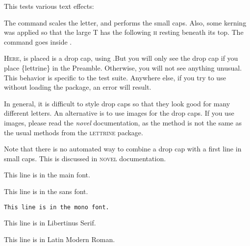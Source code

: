 \documentclass[test]{novel} %
\begin{document}
\clearpage



This tests various text effects:

\null


The \string\charscale\space command scales the letter, and \string\FirstLine\space performs the small caps. Also, some kerning was applied so that the large T has the following \textsc{h} resting beneath its top. The \string\noindent\space command goes inside \string\FirstLine.

\null\null

\lettrine{H}{ere}, is placed is a drop cap, using \string\lettrine. But you will only see the drop cap if you place \string\RequirePackage\{lettrine\} in the Preamble. Otherwise, you will not see anything unusual. This behavior is specific to the test suite. Anywhere else, if you try to use \string{}\space without loading the package, an error will result.\par
In general, it is difficult to style drop caps so that they look good for many different letters. An alternative is to use images for the drop caps. If you use images, please read the \textit{novel} documentation, as the method is not the same as the usual methods from the \textsc{lettrine} package.\par
Note that there is no automated way to combine a drop cap with a first line in small caps. This is discussed in \textsc{novel} documentation.

\null
This line is in the main font.\par
\textsf{This line is in the sans font.}\par
\texttt{This line is in the mono font.}\par
{\mustbelibertinus This line is in Libertinus Serif.}\par %
{\mustbelmodern This line is in Latin Modern Roman.}\par %


\clearpage



\thispagestyle{dropfoliobeneath}
\end{document}
